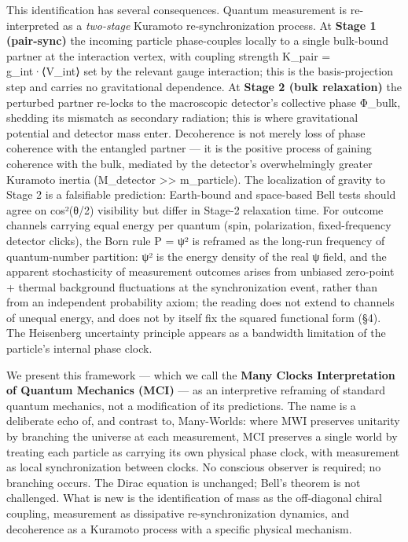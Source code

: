 \documentclass[
]{article}
\begin{document}
This identification has several consequences. Quantum measurement is
re-interpreted as a \emph{two-stage} Kuramoto re-synchronization
process. At \textbf{Stage 1 (pair-sync)} the incoming particle
phase-couples locally to a single bulk-bound partner at the interaction
vertex, with coupling strength K\_pair = g\_int·⟨V\_int⟩ set by the
relevant gauge interaction; this is the basis-projection step and
carries no gravitational dependence. At \textbf{Stage 2 (bulk
relaxation)} the perturbed partner re-locks to the macroscopic
detector's collective phase Φ\_bulk, shedding its mismatch as secondary
radiation; this is where gravitational potential and detector mass
enter. Decoherence is not merely loss of phase coherence with the
entangled partner --- it is the positive process of gaining coherence
with the bulk, mediated by the detector's overwhelmingly greater
Kuramoto inertia (M\_detector \textgreater\textgreater{} m\_particle).
The localization of gravity to Stage 2 is a falsifiable prediction:
Earth-bound and space-based Bell tests should agree on cos²(θ/2)
visibility but differ in Stage-2 relaxation time. For outcome channels
carrying equal energy per quantum (spin, polarization, fixed-frequency
detector clicks), the Born rule P = \textbar ψ\textbar² is reframed as
the long-run frequency of quantum-number partition: \textbar ψ\textbar²
is the energy density of the real ψ field, and the apparent
stochasticity of measurement outcomes arises from unbiased zero-point +
thermal background fluctuations at the synchronization event, rather
than from an independent probability axiom; the reading does not extend
to channels of unequal energy, and does not by itself fix the squared
functional form (§4). The Heisenberg uncertainty principle appears as a
bandwidth limitation of the particle's internal phase clock.

We present this framework --- which we call the \textbf{Many Clocks
Interpretation of Quantum Mechanics (MCI)} --- as an interpretive
reframing of standard quantum mechanics, not a modification of its
predictions. The name is a deliberate echo of, and contrast to,
Many-Worlds: where MWI preserves unitarity by branching the universe at
each measurement, MCI preserves a single world by treating each particle
as carrying its own physical phase clock, with measurement as local
synchronization between clocks. No conscious observer is required; no
branching occurs. The Dirac equation is unchanged; Bell's theorem is not
challenged. What is new is the identification of mass as the
off-diagonal chiral coupling, measurement as dissipative
re-synchronization dynamics, and decoherence as a Kuramoto process with
a specific physical mechanism.
\end{document}
